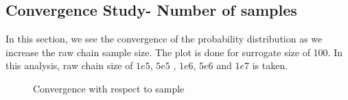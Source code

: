 \subsection{Convergence Study- Number of samples }

 In this section, we see the convergence of the probability distribution as we increase the raw chain sample size. The plot is done for surrogate size of 100. In this analysis, raw chain size of $1e5$, $5e5$ , $1e6$, $5e6$ and $1e7$ is taken.

\begin{figure}[H]
            \caption{Convergence with respect to sample}
\end{figure}


